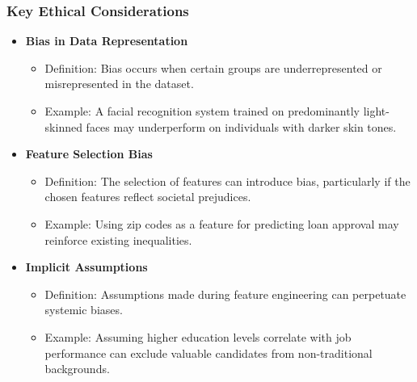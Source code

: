 \documentclass[aspectratio=169]{beamer}
\begin{document}
\begin{frame}
    \frametitle{Key Ethical Considerations}
    \begin{itemize}
        \item \textbf{Bias in Data Representation}
            \begin{itemize}
                \item Definition: Bias occurs when certain groups are underrepresented or misrepresented in the dataset.
                \item Example: A facial recognition system trained on predominantly light-skinned faces may underperform on individuals with darker skin tones.
            \end{itemize}
        
        \item \textbf{Feature Selection Bias}
            \begin{itemize}
                \item Definition: The selection of features can introduce bias, particularly if the chosen features reflect societal prejudices.
                \item Example: Using zip codes as a feature for predicting loan approval may reinforce existing inequalities.
            \end{itemize}
        
        \item \textbf{Implicit Assumptions}
            \begin{itemize}
                \item Definition: Assumptions made during feature engineering can perpetuate systemic biases.
                \item Example: Assuming higher education levels correlate with job performance can exclude valuable candidates from non-traditional backgrounds.
            \end{itemize}
    \end{itemize}
\end{frame}
\end{document}
